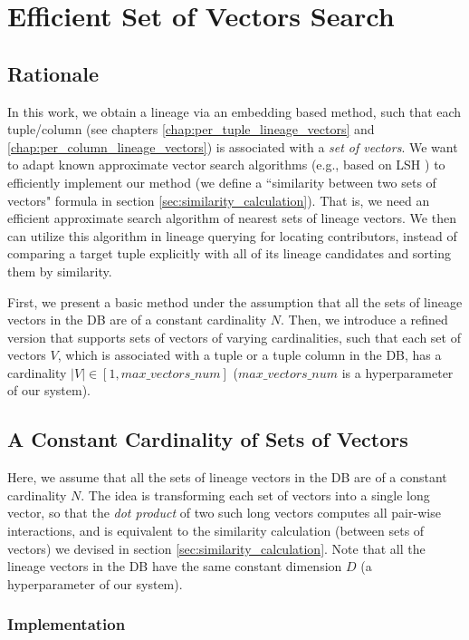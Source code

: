 \chapter{Efficient Set of Vectors Search}
\label{appendix:efficient_vectors_search}

\section{Rationale}
In this work, we obtain a lineage via an embedding based method, such that each tuple/column (see chapters \ref{chap:per_tuple_lineage_vectors} and \ref{chap:per_column_lineage_vectors}) is associated with a \textit{set of vectors}.
We want to adapt known approximate vector search algorithms (e.g., based on LSH \cite{lsh}) to efficiently implement our method (we define a ``similarity between two sets of vectors" formula in section \ref{sec:similarity_calculation}). That is, we need an efficient approximate search algorithm of nearest sets of lineage vectors. We then can utilize this algorithm in lineage querying for locating contributors, instead of comparing a target tuple explicitly with all of its lineage candidates and sorting them by similarity.
\par First, we present a basic method under the assumption that all the sets of lineage vectors in the DB are of a constant cardinality $N$. Then, we introduce a refined version that supports sets of vectors of varying cardinalities, such that each set of vectors $V$, which is associated with a tuple or a tuple column in the DB, has a cardinality $|V| \in [1, max\_vectors\_num]$ ($max\_vectors\_num$ is a hyperparameter of our system).


\section{A Constant Cardinality of Sets of Vectors}
Here, we assume that all the sets of lineage vectors in the DB are of a constant cardinality $N$. The idea is transforming each set of vectors into a single long vector, so that the \textit{dot product} of two such long vectors computes all pair-wise interactions, and is equivalent to the similarity calculation (between sets of vectors) we devised in section \ref{sec:similarity_calculation}. Note that all the lineage vectors in the DB have the same constant dimension $D$ (a hyperparameter of our system).

\subsection{Implementation}\label{sec:constant_cardinality_vector_search}

